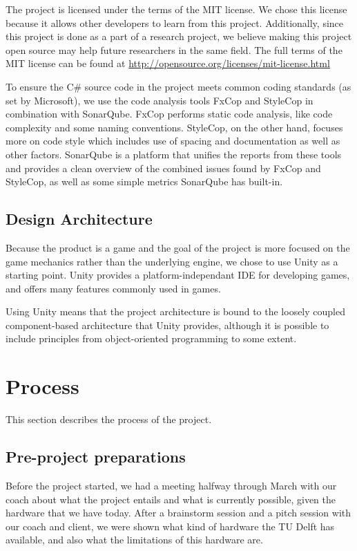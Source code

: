       The project is licensed under the terms of the MIT license. We chose
      this license because it allows other developers to learn from this
      project. Additionally, since this project is done as a part of a
      research project, we believe making this project open source may
      help future researchers in the same field. The full terms of the MIT
      license can be found at \url{http://opensource.org/licenses/mit-license.html}

      To ensure the C\# source code in the project meets common coding standards
      (as set by Microsoft), we use the code analysis tools FxCop and StyleCop
      in combination with SonarQube. FxCop performs static code analysis, like
      code complexity and some naming conventions. StyleCop, on the other hand,
      focuses more on code style which includes use of spacing and
      documentation as well as other factors. SonarQube is a platform that
      unifies the reports from these tools and provides a clean overview of the
      combined issues found by FxCop and StyleCop, as well as some simple metrics
      SonarQube has built-in.

    \subsection{Design Architecture} \label{ssec:designarchitecture}
      Because the product is a game and the goal of the project is more
      focused on the game mechanics rather than the underlying engine, we chose
      to use Unity as a starting point. Unity provides a platform-independant
      IDE for developing games, and offers many features commonly used in
      games.

      Using Unity means that the project architecture is bound to the
      loosely coupled component-based architecture that Unity provides,
      although it is possible to include principles from object-oriented
      programming to some extent.
      
    \section{Process}\label{sec:process}
      This section describes the process of the project.
      
      \subsection{Pre-project preparations} \label{ssec:preparations}
      Before the project started, we had a meeting halfway through March
      with our coach about what the project entails and what is currently
      possible, given the hardware that we have today. After a brainstorm
      session and a pitch session with our coach and client, we were shown 
      what kind of hardware the TU Delft has available, and also what the 
      limitations of this hardware are.
      
